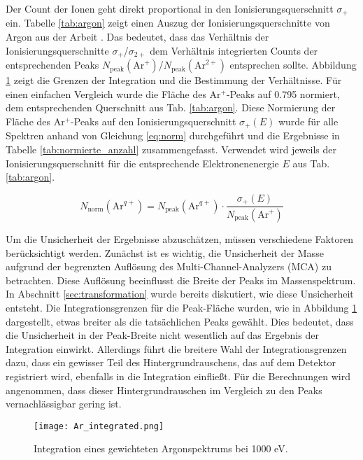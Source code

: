 Der Count der Ionen geht direkt proportional in den Ionisierungsquerschnitt $\sigma_+$ ein. Tabelle \ref{tab:argon} zeigt einen Auszug der Ionisierungsquerschnitte von Argon aus der Arbeit \cite{Straub}. Das bedeutet, dass das Verhältnis der Ionisierungsquerschnitte $\sigma_+$/$\sigma_{2+}$ dem Verhältnis integrierten Counts der entsprechenden Peaks $N_\text{peak}(\text{Ar}^+)$/$N_\text{peak}(\text{Ar}^{2+})$ entsprechen sollte. Abbildung \ref{fig:ar_ratio} zeigt die Grenzen der Integration und die Bestimmung der Verhältnisse. Für einen einfachen Vergleich wurde die Fläche des Ar$^+$-Peaks auf 0.795 normiert, dem entsprechenden Querschnitt aus Tab. \ref{tab:argon}.
Diese Normierung der Fläche des Ar$^{+}$-Peaks auf den Ionisierungsquerschnitt $\sigma_+(E)$ wurde für alle Spektren anhand von Gleichung \ref{eq:norm} durchgeführt und die Ergebnisse in Tabelle \ref{tab:normierte_anzahl} zusammengefasst. Verwendet wird jeweils der Ionisierungsquerschnitt für die entsprechende Elektronenenergie $E$ aus Tab. \ref{tab:argon}.

\begin{equation}
    \label{eq:norm}
    N_{\text{norm}}(\text{Ar}^{q+}) = N_\text{peak}(\text{Ar}^{q+}) \cdot \frac{\sigma_{+}(E)}{N_\text{peak}(\text{Ar}^{+})}
\end{equation}

Um die Unsicherheit der Ergebnisse abzuschätzen, müssen verschiedene Faktoren berücksichtigt werden. Zunächst ist es wichtig, die Unsicherheit der Masse aufgrund der begrenzten Auflösung des Multi-Channel-Analyzers (MCA) zu betrachten. Diese Auflösung beeinflusst die Breite der Peaks im Massenspektrum. In Abschnitt \ref{sec:transformation} wurde bereits diskutiert, wie diese Unsicherheit entsteht. Die Integrationsgrenzen für die Peak-Fläche wurden, wie in Abbildung \ref{fig:ar_ratio} dargestellt, etwas breiter als die tatsächlichen Peaks gewählt. Dies bedeutet, dass die Unsicherheit in der Peak-Breite nicht wesentlich auf das Ergebnis der Integration einwirkt. Allerdings führt die breitere Wahl der Integrationsgrenzen dazu, dass ein gewisser Teil des Hintergrundrauschens, das auf dem Detektor registriert wird, ebenfalls in die Integration einfließt. Für die Berechnungen wird angenommen, dass dieser Hintergrundrauschen im Vergleich zu den Peaks vernachlässigbar gering ist.

\begin{figure}
    \hspace{-1.1cm}\texttt{[image: Ar\_integrated.png]}
    \caption[Integration eines, auf die Werte von Straub et al. gewichteten, Argonspektrums bei 1000 eV]{Integration eines gewichteten Argonspektrums bei 1000 eV.}
    \label{fig:ar_ratio}
\end{figure}

